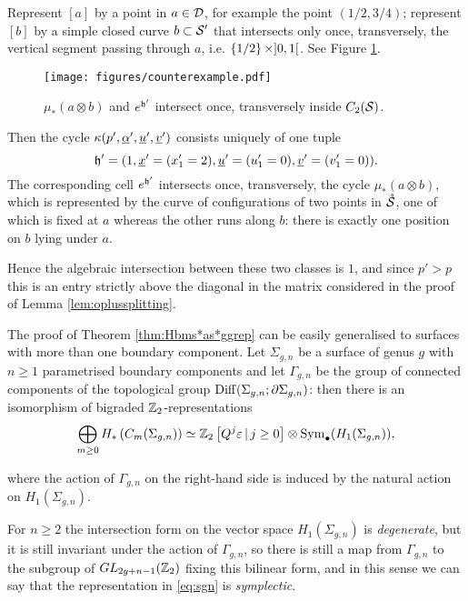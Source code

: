 Represent $[a]$ by a point in $a\in\D$, for example
the point $(1/2,3/4)$; represent $[b]$ by a simple closed curve $b\subset\S'$
that intersects only once, transversely, the vertical segment passing through $a$, i.e.
$\set{1/2}\times]0,1[$. See Figure \ref{fig:counterexample}.

\begin{figure}\centering
 \texttt{[image: figures/counterexample.pdf]}
 \caption{$\mu_*(a\otimes b)$ and $e^{\tup'}$ intersect once, transversely inside $C_2(\S)$.}
\label{fig:counterexample}
\end{figure}

Then the cycle $\kappa(p',\ualpha',\uu',\uv')$ consists uniquely of one tuple
\[
\tup'=(1,\ux'=(x'_1=2),\uu'=(u'_1=0),\uv'=(v'_1=0)).
\]
The corresponding cell $e^{\tup'}$ intersects once, transversely,
the cycle $\mu_*(a\otimes b)$, which is represented by the curve of configurations of two
points in $\mrS$, one of which is fixed at $a$ whereas the other runs along $b$:
there is exactly one position on $b$ lying under $a$.

Hence the algebraic intersection between these two classes is $1$, and since $p'>p$
this is an entry strictly above the diagonal in the matrix considered in the proof
of Lemma \ref{lem:oplussplitting}.

The proof of Theorem \ref{thm:Hbms*as*ggrep} can be easily generalised to surfaces
with more than one boundary component. Let $\Sigma_{g,n}$ be a surface of genus
$g$ with $n\geq 1$ parametrised boundary components and let $\Gamma_{g,n}$ be
the group of connected components of the topological group
$\Diff(\Sigma_{g,n};\partial\Sigma_{g,n})$:
then there is an isomorphism of bigraded $\Z_2$-representations
\begin{equation}
\label{eq:sgn}
\bigoplus_{m\geq 0}H_*\pa{C_m(\Sigma_{g,n})}\simeq \Z_2\left[Q^j\epsilon\,|\, j\geq 0\right]\otimes\Sym_{\bullet}(H_1(\Sigma_{g,n})),
\end{equation}

where the action of $\Gamma_{g,n}$ on the right-hand side is induced by the natural
action on $H_1(\Sigma_{g,n})$.

For $n\geq 2$ the intersection form on the vector space $H_1(\Sigma_{g,n})$
is \emph{degenerate}, but it is still invariant under the action of
$\Gamma_{g,n}$, so there is still a map from $\Gamma_{g,n}$ to the subgroup
of $GL_{2g+n-1}(\Z_2)$ fixing this bilinear form, and in this sense we can say
that the representation in \eqref{eq:sgn} is \emph{symplectic}.

